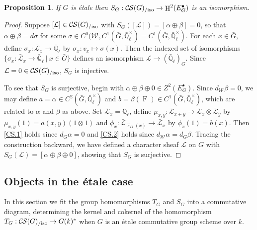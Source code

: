 \documentclass[10pt]{amsart}
\theoremstyle{plain}
\newtheorem{proposition}[theorem]{Proposition}
\theoremstyle{definition}
\theoremstyle{remark}
\newtheorem{remark}[theorem]{Remark}
\newcommand{\EE}{\mathbb{\bar Q}_\ell}
\newcommand{\Fq}{k}
\newcommand{\EEx}{\EE^\times}
\newcommand{\Weil}[1]{\mathcal{W}_{#1}}
\newcommand{\Frob}[1]{\operatorname{F}_{#1}}
\DeclareMathOperator{\Hh}{H}
\newcommand{\tq}{{\ \vert\ }}
\newcommand{\TrFrob}[1]{T_{#1}}
\newcommand{\cs}[1]{{\mathcal{#1}}}
\newcommand{\gcs}[1]{{\mathcal{\bar #1}}}
\newcommand{\CS}{{\mathcal{C\hskip-0.8pt S}}}
\newcommand{\CSiso}[1]{\CS(#1)_{/\text{iso}}}
\newcommand{\bG}{\bar{G}}
\begin{document}

\begin{proposition}\label{prop:SGiso}
If $G$ is \'etale then $S_G:  \CSiso{G} \to \Hh^2(E^\bullet_G)$ is an isomorphism.
\end{proposition}
\begin{proof}
Suppose $[\cs{L}] \in \CSiso{G}$ with $S_G([\cs{L}]) = [\alpha \oplus \beta] = 0$,
so that $\alpha \oplus \beta = d\sigma$ for some $\sigma \in C^0(\Weil{},C^1(\bG,\EEx) = C^1(\bG,\EEx)$.
For each $x\in \bG$, define $\sigma_x : \gcs{L}_x \to \EE$ by $\sigma_x : v_x \mapsto \sigma(x)$.
Then the indexed set of isomorphisms $\{ \sigma_x : \gcs{L}_x \to \EE \tq x\in \bG\}$
defines an isomorphism $\cs{L} \to (\EE)_G$.
Since $\cs{L} = 0 \in \CSiso{G}$, $S_G$ is injective.

To see that $S_G$ is surjective, begin with $\alpha\oplus\beta\oplus 0 \in Z^2(E^\bullet_G)$.
Since $d_{\Weil{}} \beta = 0$, we may define $a = \alpha \in C^2(\bG,\EEx)$ and
$b = \beta(\Frob{}) \in C^1(\bG,\EEx)$, which are related to $\alpha$ and $\beta$ as above.
Set $\gcs{L}_x = \EE$, define $\mu_{x,y} : \gcs{L}_{x+y} \to \gcs{L}_x\otimes\gcs{L}_y$
by $\mu_{x,y}(1) = a(x,y) (1\otimes 1)$ and $\phi_x : \gcs{L}_{\Frob{G}(x)} \to \gcs{L}_x$ by $\phi_x(1)= b(x)$.
Then \ref{CS.1} holds since $d_G \alpha =0$ and \ref{CS.2} holds since $d_{\Weil{}}\alpha =d_G \beta$.
Tracing the construction backward, we have defined a character sheaf $\cs{L}$ on $G$ with
$S_G(\cs{L}) = [\alpha\oplus\beta\oplus 0]$, showing that $S_G$ is surjective.
\end{proof}


\subsection{Objects in the \'etale case}\label{ssec:SandT}

In this section we fit the group homomorphisms $\TrFrob{G}$ and $S_G$ into a commutative diagram, determining the kernel and cokernel of the homomorphism $\TrFrob{G} : \CSiso{G} \to G(k)^*$ when $G$ is an \'etale commutative group scheme over $\Fq$.
\end{document}
